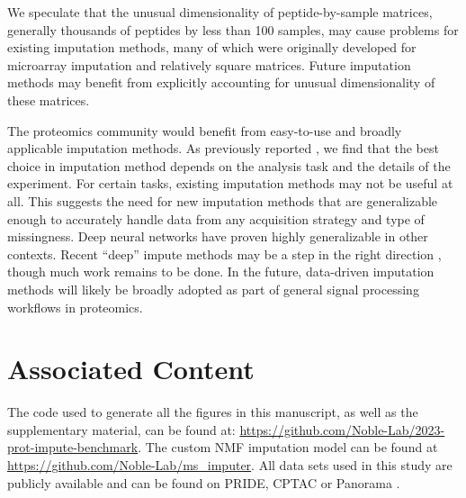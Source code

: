 \documentclass{article}
\begin{document}
We speculate that the unusual dimensionality of peptide-by-sample matrices, generally thousands of peptides by less than 100 samples, may cause problems for existing imputation methods, many of which were originally developed for microarray imputation and relatively square matrices. Future imputation methods may benefit from explicitly accounting for unusual dimensionality of these matrices. 

The proteomics community would benefit from easy-to-use and broadly applicable imputation methods. As previously reported \cite{Bramer:review, Webb-Robertson:review, DIMA, lazar}, we find that the best choice in imputation method depends on the analysis task and the details of the experiment. For certain tasks, existing imputation methods may not be useful at all. This suggests the need for new imputation methods that are generalizable enough to accurately handle data from any acquisition strategy and type of missingness. Deep neural networks have proven highly generalizable in other contexts. Recent ``deep'' impute methods may be a step in the right direction \cite{deep-impute}, though much work remains to be done. In the future, data-driven imputation methods will likely be broadly adopted as part of general signal processing workflows in proteomics.

\section*{Associated Content}

The code used to generate all the figures in this manuscript, as well as the supplementary material, can be found at: \url{https://github.com/Noble-Lab/2023-prot-impute-benchmark}. The custom NMF imputation model can be found at \url{https://github.com/Noble-Lab/ms_imputer}. All data sets used in this study are publicly available and can be found on PRIDE, CPTAC or Panorama \cite{PRIDE, CPTAC, panorama-public}. 


 

\clearpage
\appendix
\renewcommand{\figurename}{Supplementary Figure}
\renewcommand{\theequation}{S\arabic{equation}}
\renewcommand{\thefigure}{S\arabic{figure}}
\renewcommand{\thesection}{S\arabic{section}}
\renewcommand{\thetable}{S\arabic{table}}
\setcounter{table}{0}
\setcounter{figure}{0}
\end{document}
